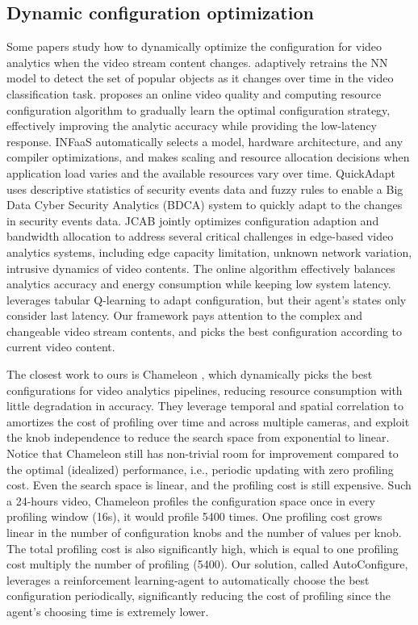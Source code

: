 \subsection{Dynamic configuration optimization}
Some papers study how to dynamically optimize the configuration for video analytics when the video stream content changes. \cite{shen2017retrain_model} adaptively retrains the NN model to detect the set of popular objects as it changes over time in the video classification task. \cite{yang2019edge_coordinated} proposes an online video quality and computing resource configuration algorithm to gradually learn the optimal configuration strategy, effectively improving the analytic accuracy while providing the low-latency response. INFaaS \cite{romero2019infaas} automatically selects a model, hardware architecture, and any compiler optimizations, and makes scaling and resource allocation decisions when application load varies and the available resources vary over time. QuickAdapt \cite{ullah2019quickadapt} uses
descriptive statistics of security events data and fuzzy rules to
enable a Big Data Cyber Security Analytics (BDCA) system to quickly adapt to the changes in security events data. JCAB \cite{wang2020jcab} jointly optimizes configuration adaption and bandwidth allocation to address several critical challenges in edge-based video analytics systems, including edge capacity limitation, unknown network variation, intrusive dynamics of video contents. The online algorithm effectively balances analytics accuracy and energy consumption while keeping low system latency. \cite{argerich2019orchestration} leverages tabular Q-learning to adapt configuration, but their agent's states only consider last latency. Our framework pays attention to the complex and changeable video stream contents, and picks the best configuration according to current video content. 

The closest work to ours is Chameleon \cite{jiang2018chameleon}, which dynamically picks the best configurations for video analytics pipelines, reducing resource consumption with little degradation in accuracy. They leverage temporal and spatial correlation to amortizes the cost of profiling over time and across multiple cameras, and exploit the knob independence to reduce the search space from exponential to linear.\cite{jiang2018chameleon} Notice that Chameleon still has non-trivial room for improvement compared to the optimal (idealized) performance, i.e.,
periodic updating with zero profiling cost. Even the search space is linear, and the profiling cost is still expensive. Such a 24-hours video, Chameleon profiles the configuration space once in every profiling window (16s), it would profile 5400 times. One profiling cost grows linear in the number of configuration knobs and the number of values per knob. The total profiling cost is also significantly high, which is equal to one profiling cost multiply the number of profiling (5400). Our solution, called AutoConfigure, leverages a reinforcement learning-agent to automatically choose the best configuration periodically, significantly reducing the cost of profiling since the agent's choosing time is extremely lower. 